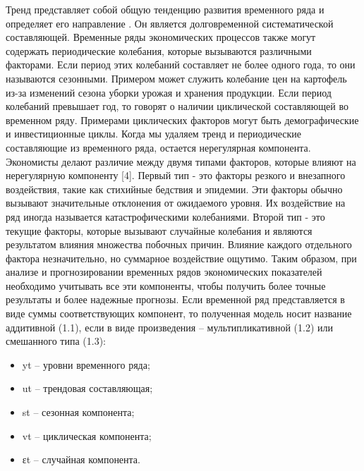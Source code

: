 Тренд представляет собой общую тенденцию развития временного ряда и определяет его направление \cite{ивин2020математический}. Он является долговременной систематической составляющей. Временные ряды экономических процессов также могут содержать периодические колебания, которые вызываются различными факторами. Если период этих колебаний составляет не более одного года, то они называются сезонными. Примером может служить колебание цен на картофель из-за изменений сезона уборки урожая и хранения продукции.
Если период колебаний превышает год, то говорят о наличии циклической составляющей во временном ряду. Примерами циклических факторов могут быть демографические и инвестиционные циклы.
Когда мы удаляем тренд и периодические составляющие из временного ряда, остается нерегулярная компонента. Экономисты делают различие между двумя типами факторов, которые влияют на нерегулярную компоненту [4].
Первый тип - это факторы резкого и внезапного воздействия, такие как стихийные бедствия и эпидемии. Эти факторы обычно вызывают значительные отклонения от ожидаемого уровня. Их воздействие на ряд иногда называется катастрофическими колебаниями.
Второй тип - это текущие факторы, которые вызывают случайные колебания и являются результатом влияния множества побочных причин. Влияние каждого отдельного фактора незначительно, но суммарное воздействие ощутимо.
Таким образом, при анализе и прогнозировании временных рядов экономических показателей необходимо учитывать все эти компоненты, чтобы получить более точные результаты и более надежные прогнозы.
Если временной ряд представляется в виде суммы соответствующих компонент, то полученная модель носит название аддитивной (1.1), если в виде произведения – мультипликативной (1.2) или смешанного типа (1.3):

\begin{itemize}
	\item yt – уровни временного ряда; 
	\item ut – трендовая составляющая; 
	\item st – сезонная компонента; 
	\item vt – циклическая компонента;
	\item εt – случайная компонента.
\end{itemize}

